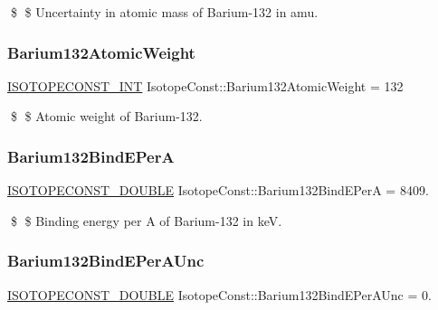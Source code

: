 \$ \$ Uncertainty in atomic mass of Barium-\/132 in amu. \mbox{\label{group___isotope_const-_barium-_ba132_ga32e75a7df01a6a80b650b9b5765d70f6}} 
\subsubsection{\texorpdfstring{Barium132\+Atomic\+Weight}{Barium132AtomicWeight}}
{\footnotesize\ttfamily \mbox{\hyperlink{group___isotope_const-_macros_ga5f18360b3e99483a35c32d789e62621c}{I\+S\+O\+T\+O\+P\+E\+C\+O\+N\+S\+T\+\_\+\+I\+NT}} Isotope\+Const\+::\+Barium132\+Atomic\+Weight = 132}

\$ \$ Atomic weight of Barium-\/132. \mbox{\label{group___isotope_const-_barium-_ba132_ga905b2bb479851eaadf540717a0fc796d}} 
\subsubsection{\texorpdfstring{Barium132\+Bind\+E\+PerA}{Barium132BindEPerA}}
{\footnotesize\ttfamily \mbox{\hyperlink{group___isotope_const-_macros_ga8f45a7272ce02c0b4c65c44636ed719a}{I\+S\+O\+T\+O\+P\+E\+C\+O\+N\+S\+T\+\_\+\+D\+O\+U\+B\+LE}} Isotope\+Const\+::\+Barium132\+Bind\+E\+PerA = 8409.}

\$ \$ Binding energy per A of Barium-\/132 in keV. \mbox{\label{group___isotope_const-_barium-_ba132_ga8236ba7b2c0ce338d0c410a335e36beb}} 
\subsubsection{\texorpdfstring{Barium132\+Bind\+E\+Per\+A\+Unc}{Barium132BindEPerAUnc}}
{\footnotesize\ttfamily \mbox{\hyperlink{group___isotope_const-_macros_ga8f45a7272ce02c0b4c65c44636ed719a}{I\+S\+O\+T\+O\+P\+E\+C\+O\+N\+S\+T\+\_\+\+D\+O\+U\+B\+LE}} Isotope\+Const\+::\+Barium132\+Bind\+E\+Per\+A\+Unc = 0.}

